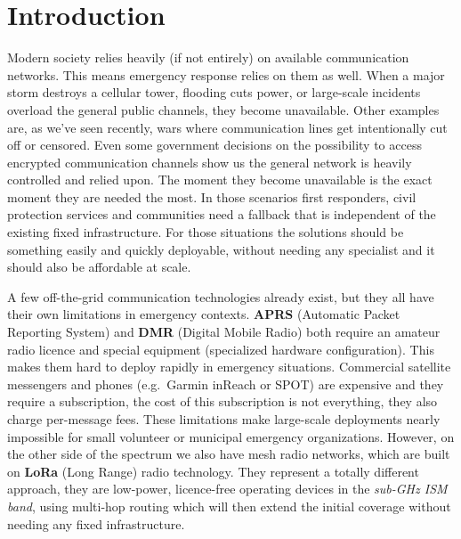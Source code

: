 \section{Introduction}%
\label{sec:introduction}

Modern society relies heavily (if not entirely) on available communication networks.
This means emergency response relies on them as well. When a major storm destroys a cellular
tower, flooding cuts power, or large-scale incidents overload the general public channels,
they become unavailable. Other examples are, as we've seen recently, wars where communication lines get
intentionally cut off or censored. Even some government decisions on the possibility to access encrypted communication
channels show us the general network is heavily controlled and relied upon. The moment they become unavailable
is the exact moment they are needed the most. In those scenarios first responders, civil protection services and communities need a
fallback that is independent of the existing fixed infrastructure. For those situations the solutions should be something easily and
quickly deployable, without needing any specialist and it should also be affordable at scale.

A few off-the-grid communication technologies already exist, but they all have their own limitations
in emergency contexts. \textbf{APRS} (Automatic Packet Reporting System) and \textbf{DMR}
(Digital Mobile Radio) both require an amateur radio licence and special equipment (specialized hardware
configuration). This makes them hard to deploy rapidly in emergency situations. Commercial satellite messengers
and phones (e.g.\ Garmin inReach or SPOT) are expensive and they require a subscription, the cost of this subscription
is not everything, they also charge per-message fees. These limitations make large-scale deployments nearly impossible
for small volunteer or municipal emergency organizations. However, on the other side of the spectrum we also have mesh
radio networks, which are built on \textbf{LoRa} (Long Range) radio technology.
They represent a totally different approach, they are low-power, licence-free operating
devices in the \emph{sub-GHz ISM band}, using multi-hop routing which will then extend the initial coverage
without needing any fixed infrastructure.

